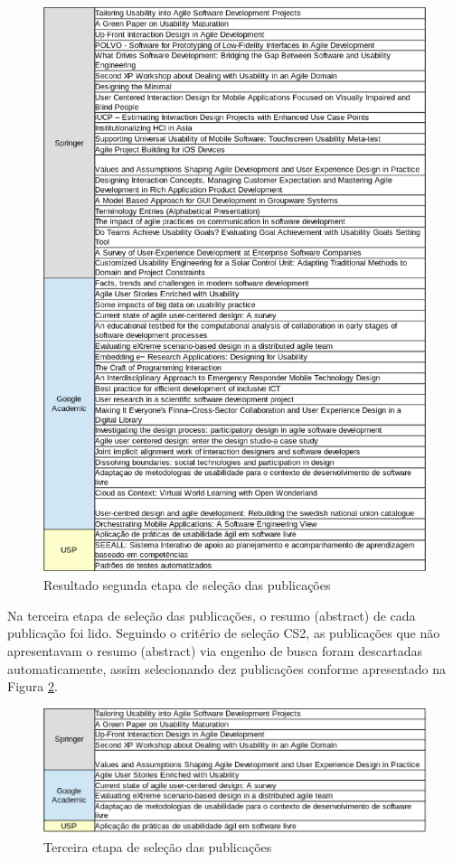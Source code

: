 \documentclass[12pt]{article}
\begin{document}
\begin{figure}[hbt]
  \begin{center}
    \includegraphics[width=1\textwidth]{figure/tabela1.eps}
    \caption{Resultado segunda etapa de seleção das publicações}
    \label{fig:tabela1}
  \end{center}
\end{figure}

%
Na terceira etapa de seleção das publicações, o resumo (abstract) de cada publicação foi lido. Seguindo o critério de seleção CS2, as publicações que não apresentavam o resumo (abstract) via engenho de busca foram descartadas automaticamente, assim selecionando dez publicações conforme apresentado na Figura \ref{fig:tabela2}.

\begin{figure}[hbt]
  \begin{center}
    \includegraphics[width=1\textwidth]{figure/tabela2.eps}
    \caption{Terceira etapa de seleção das publicações}
    \label{fig:tabela2}
  \end{center}
\end{figure}
\end{document}
